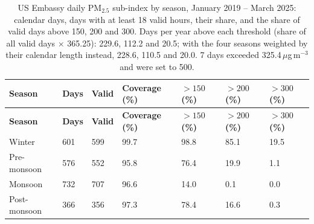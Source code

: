 \begingroup\footnotesize
\begin{longtable}{L{2.6cm} C{1.6cm} C{1.4cm} C{1.6cm} C{1.6cm} C{1.6cm} C{1.6cm}}
\caption{US Embassy daily PM$_{2.5}$ sub-index by season, January 2019 -- March 2025: calendar days, days with at least 18 valid hours, their share, and the share of valid days above 150, 200 and 300. Days per year above each threshold (share of all valid days $\times$ 365.25): 229.6, 112.2 and 20.5; with the four seasons weighted by their calendar length instead, 228.6, 110.5 and 20.0. 7 days exceeded 325.4\,$\mu$g\,m$^{-3}$ and were set to 500.}\label{tab:s-aqi-annual}\\
\toprule
\textbf{Season} & \textbf{Days} & \textbf{Valid} & \textbf{Coverage (\%)} & \textbf{$>150$ (\%)} & \textbf{$>200$ (\%)} & \textbf{$>300$ (\%)} \\
\midrule\endfirsthead
\toprule
\textbf{Season} & \textbf{Days} & \textbf{Valid} & \textbf{Coverage (\%)} & \textbf{$>150$ (\%)} & \textbf{$>200$ (\%)} & \textbf{$>300$ (\%)} \\
\midrule\endhead
\bottomrule\endfoot
Winter & 601 & 599 & 99.7 & 98.8 & 85.1 & 19.5 \\
Pre-monsoon & 576 & 552 & 95.8 & 76.4 & 19.9 & 1.1 \\
Monsoon & 732 & 707 & 96.6 & 14.0 & 0.1 & 0.0 \\
Post-monsoon & 366 & 356 & 97.3 & 78.4 & 16.6 & 0.3 \\
\end{longtable}
\endgroup
